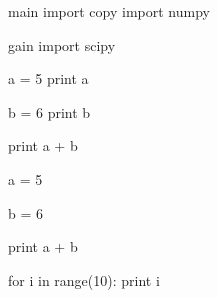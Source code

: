 \documentclass[a4paper,12pt]{book}
\begin{document}
\begin{pytexTemplate}{main}
import copy
import numpy
\end{pytexTemplate}


\begin{pytexTemplate}{gain}
import scipy
\end{pytexTemplate}



\begin{pytex}
a = 5
print a
\end{pytex}

\begin{pytex}
b = 6
print b
\end{pytex}

\begin{pytex}
print a + b
\end{pytex}


\begin{pytex}
a = 5
\end{pytex}

\begin{pytex}
b = 6
\end{pytex}

\begin{pytex}
print a + b
\end{pytex}


\begin{pytex}
for i in range(10):
  print i
\end{pytex}
\end{document}
